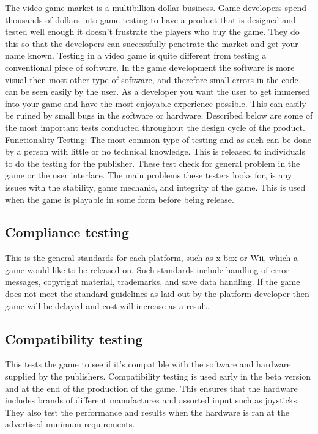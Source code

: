 The video game market is a multibillion dollar business. Game developers spend thousands of dollars into game testing to have a product that is designed and tested well enough it doesn't frustrate the players who buy the game.  They do this so that the developers can successfully penetrate the market and get your name known.  Testing in a video game is quite different from testing a conventional piece of software. In the game development the software is more visual then most other type of software, and therefore small errors in the code can be seen easily by the user. As a developer you want the user to get immersed into your game and have the most enjoyable experience possible. This can easily be ruined by small bugs in the software or hardware. Described below are some of the most important tests conducted throughout the design cycle of the product.
Functionality Testing: The most common type of testing and as such can be done by a person with little or no technical knowledge. This is released to individuals to do the testing for the publisher. These test check for general problem in the game or the user interface. The main problems these testers looks for, is any issues with the stability, game mechanic, and integrity of the game. This is used when the game is playable in some form before being release.

\subsection{Compliance testing}  This is the general standards for each platform, such as x-box or Wii, which a game would like to be released on.  Such standards include handling of error messages, copyright material, trademarks, and save data handling. If the game does not meet the standard guidelines as laid out by the platform developer then game will be delayed and cost will increase as a result.

 \subsection{Compatibility testing}  This tests the game to see if it’s compatible with the software and hardware supplied by the publishers.  Compatibility testing is used early in the beta version and at the end of the production of the game.  This ensures that the hardware includes brands of different manufactures and assorted input such as joysticks. They also test the performance and results when the hardware is ran at the advertised minimum requirements.

